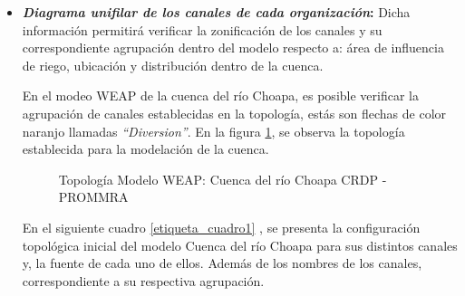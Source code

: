 \documentclass[]{article}
\begin{document}
\begin{itemize}

\item \textbf{\textit{Diagrama unifilar de los canales de cada organización}:} Dicha información permitirá verificar la zonificación de los canales y su correspondiente agrupación dentro del modelo respecto a: área de influencia de riego, ubicación y distribución dentro de la cuenca.

En el modeo WEAP de la cuenca del río Choapa, es posible verificar la agrupación de canales establecidas en la topología, estás son flechas de color naranjo llamadas \textit{“Diversion”}. En la figura \ref{etiqueta_figura3}, se observa la topología establecida para la modelación de la cuenca.


\begin{figure}[H]
\begin{center}
\caption{Topología Modelo WEAP: Cuenca del río Choapa CRDP - PROMMRA}
\label{etiqueta_figura3}
\end{center}
\end{figure}

En el siguiente cuadro \ref{etiqueta_cuadro1} , se presenta la configuración topológica inicial del modelo Cuenca del río Choapa para sus distintos canales y, la fuente de cada uno de ellos. Además de los nombres de los canales, correspondiente a su respectiva agrupación. 


\end{itemize}
\end{document}
